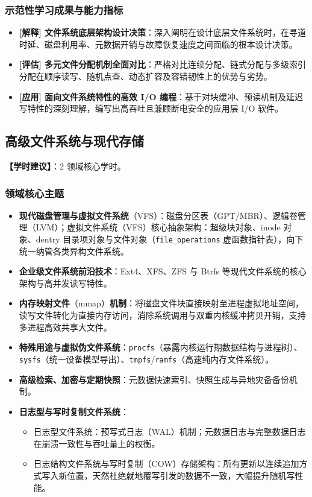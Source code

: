 \subsubsection{示范性学习成果与能力指标}
\begin{itemize}\setlength{\itemsep}{0pt}\setlength{\parskip}{0pt}
    \item \textbf{[解释] 文件系统底层架构设计决策}：深入阐明在设计底层文件系统时，在寻道时延、磁盘利用率、元数据开销与故障恢复速度之间面临的根本设计决策。
    \item \textbf{[评估] 多元文件分配机制全面对比}：严格对比连续分配、链式分配与多级索引分配在顺序读写、随机点查、动态扩容及容错韧性上的优势与劣势。
    \item \textbf{[应用] 面向文件系统特性的高效 I/O 编程}：基于对块缓冲、预读机制及延迟写特性的深刻理解，编写出高吞吐且兼顾断电安全的应用层 I/O 软件。
\end{itemize}

\subsection{高级文件系统与现代存储}
\textbf{【学时建议】}：2 领域核心学时。

\subsubsection{领域核心主题}
\begin{itemize}\setlength{\itemsep}{0pt}\setlength{\parskip}{0pt}
    \item \textbf{现代磁盘管理与虚拟文件系统}（VFS）：磁盘分区表（GPT/MBR）、逻辑卷管理（LVM）；虚拟文件系统（VFS）核心抽象架构：超级块对象、inode 对象、dentry 目录项对象与文件对象（\texttt{file\_operations} 虚函数指针表），向下统一纳管各类异构文件系统。
    \item \textbf{企业级文件系统前沿技术}：Ext4、XFS、ZFS 与 Btrfs 等现代文件系统的核心架构与高并发读写特性。
    \item \textbf{内存映射文件}（mmap）\textbf{机制}：将磁盘文件块直接映射至进程虚拟地址空间，读写文件转化为直接内存访问，消除系统调用与双重内核缓冲拷贝开销，支持多进程高效共享大文件。
    \item \textbf{特殊用途与虚拟伪文件系统}：\texttt{procfs}（暴露内核运行期数据结构与进程树）、\texttt{sysfs}（统一设备模型导出）、\texttt{tmpfs}/\texttt{ramfs}（高速纯内存文件系统）。
    \item \textbf{高级检索、加密与定期快照}：元数据快速索引、快照生成与异地灾备备份机制。
    \item \textbf{日志型与写时复制文件系统}：
    \begin{itemize}\setlength{\itemsep}{0pt}\setlength{\parskip}{0pt}
        \item 日志型文件系统：预写式日志（WAL）机制；元数据日志与完整数据日志在崩溃一致性与吞吐量上的权衡。
        \item 日志结构文件系统与写时复制（COW）存储架构：所有更新以连续追加方式写入新位置，天然杜绝就地覆写引发的数据不一致，大幅提升随机写性能。
    \end{itemize}
\end{itemize}


